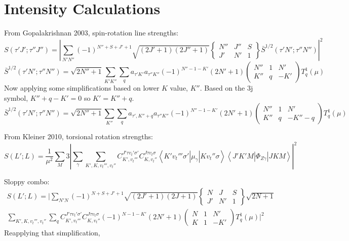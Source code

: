\documentclass{article}
\begin{document}
\section{Intensity Calculations}
From Gopalakrishnan 2003, spin-rotation line strengths:
\begin{equation}
S(\tau'J';\tau''J'') = \left|\sum_{N'N''}(-1)^{N''+S+J'+1} \sqrt{(2J'+1)(2J''+1)} 
\begin{Bmatrix}
	N'' & J'' & S \\
	J' & N' & 1
\end{Bmatrix}
\bar{S}^{1/2}(\tau'N';\tau''N'')
\right|^{2}
\end{equation}
\begin{equation}
	\bar{S}^{1/2}(\tau'N';\tau''N'') = \sqrt{2N''+1}\sum_{K'K''}\sum_{q} a_{\tau'K'}a_{\tau''K''} (-1)^{N''-1-K'}(2N'+1) 
\begin{pmatrix}
	N'' & 1 & N' \\
	K'' & q & -K'
\end{pmatrix}
T^{1}_{q}(\mu)
\end{equation}
Now applying some simplifications based on lower $K$ value, $K''$. Based on the 3j symbol, $K''+q-K'=0$ so $K'=K''+q$.
\begin{equation}
	\bar{S}^{1/2}(\tau'N';\tau''N'') = \sqrt{2N''+1}\sum_{K''}\sum_{q} a_{\tau',K''+q}a_{\tau''K''} (-1)^{N''-1-K'}(2N'+1) 
	\begin{pmatrix}
		N'' & 1 & N' \\
		K'' & q & -K''-q
	\end{pmatrix}
	T^{1}_{q}(\mu)
\end{equation}

From Kleiner 2010, torsional rotation strengths:
\begin{equation}
S(L';L) = \frac{1}{\mu^{2}}\sum_{M} 3\left| \sum_{\gamma} \sum_{K',K,v_{t}''',v_{t}''}  C^{J'\tau v_{t}'\sigma'}_{K',v_{t}'''}C^{J\tau v_{t}\sigma}_{K,v_{t}''} \left\langle K'v_{t}'''\sigma'\left|\mu_{\gamma}\right| K v_{t}''\sigma \right\rangle \left\langle J'K'M\left|\Phi_{Z\gamma}\right| JKM\right\rangle \right|^{2}
\end{equation}

Sloppy combo:
\begin{multline}
S(L';L) = \bigg|\sum_{N'N}(-1)^{N+S+J'+1} \sqrt{(2J'+1)(2J+1)} 
\begin{Bmatrix}
	N & J & S \\
	J' & N' & 1
\end{Bmatrix}
\sqrt{2N+1} \\
\sum_{K',K,v_{t}''',v_{t}''}
\sum_{q} C^{J'\tau v_{t}'\sigma'}_{K',v_{t}'''}C^{J\tau v_{t}\sigma}_{K,v_{t}''} (-1)^{N-1-K'}(2N'+1) 
\begin{pmatrix}
	N & 1 & N' \\
	K & 1 & -K'
\end{pmatrix}
T^{1}_{q}(\mu)
\bigg|^{2}
\end{multline}
Reapplying that simplification,
\end{document}
